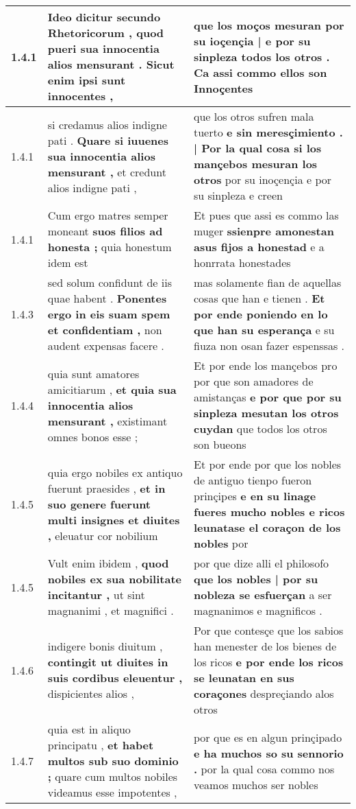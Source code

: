 \begin{tabular}{|p{1cm}|p{6.5cm}|p{6.5cm}|}
1.4.1 & Ideo dicitur secundo Rhetoricorum , \textbf{ quod pueri sua innocentia alios mensurant . } Sicut enim ipsi sunt innocentes , & que los moços mesuran \textbf{ por su ioçençia | e por su sinpleza todos los otros . } Ca assi commo ellos son Innoçentes \\\hline
1.4.1 & si credamus alios indigne pati . \textbf{ Quare si iuuenes sua innocentia alios mensurant , } et credunt alios indigne pati , & que los otros sufren mala tuerto \textbf{ e sin meresçimiento . | Por la qual cosa si los mançebos mesuran los otros } por su inoçençia e por su sinpleza e creen \\\hline
1.4.1 & Cum ergo matres semper moneant \textbf{ suos filios ad honesta ; } quia honestum idem est & Et pues que assi es commo las muger \textbf{ ssienpre amonestan asus fijos a honestad } e a honrrata honestades \\\hline
1.4.3 & sed solum confidunt de iis quae habent . \textbf{ Ponentes ergo in eis suam spem et confidentiam , } non audent expensas facere . & mas solamente fian de aquellas cosas que han e tienen . \textbf{ Et por ende poniendo en lo que han su esperança } e su fiuza non osan fazer espenssas . \\\hline
1.4.4 & quia sunt amatores amicitiarum , \textbf{ et quia sua innocentia alios mensurant , } existimant omnes bonos esse ; & Et por ende los mançebos pro por que son amadores de amistanças \textbf{ e por que por su sinpleza mesutan los otros cuydan } que todos los otros son bueons \\\hline
1.4.5 & quia ergo nobiles ex antiquo fuerunt praesides , \textbf{ et in suo genere fuerunt multi insignes et diuites , } eleuatur cor nobilium & Et por ende por que los nobles de antiguo tienpo fueron prinçipes \textbf{ e en su linage fueres mucho nobles e ricos leunatase el coraçon de los nobles } por \\\hline
1.4.5 & Vult enim ibidem , \textbf{ quod nobiles ex sua nobilitate incitantur , } ut sint magnanimi , et magnifici . & por que dize alli el philosofo \textbf{ que los nobles | por su nobleza se esfuerçan } a ser magnanimos e magnificos . \\\hline
1.4.6 & indigere bonis diuitum , \textbf{ contingit ut diuites in suis cordibus eleuentur , } dispicientes alios , & Por que contesçe que los sabios han menester de los bienes de los ricos \textbf{ e por ende los ricos se leunatan en sus coraçones } despreçiando alos otros \\\hline
1.4.7 & quia est in aliquo principatu , \textbf{ et habet multos sub suo dominio ; } quare cum multos nobiles videamus esse impotentes , & por que es en algun prinçipado \textbf{ e ha muchos so su sennorio . } por la qual cosa commo nos veamos muchos ser nobles \\\hline

\end{tabular}
